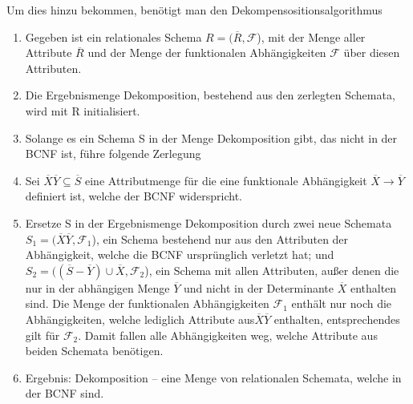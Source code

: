 Um dies hinzu bekommen, benötigt man den Dekompensositionsalgorithmus
\begin{enumerate}

\item Gegeben ist ein relationales Schema $R = (\overline R, \mathcal{F}$), mit der Menge aller Attribute $\overline R$ und der Menge der funktionalen Abhängigkeiten $\mathcal{F}$ über diesen Attributen.
\item	Die Ergebnismenge Dekomposition, bestehend aus den zerlegten Schemata, wird mit R initialisiert.
\item	Solange es ein Schema S in der Menge Dekomposition gibt, das nicht in der BCNF ist, führe folgende Zerlegung \item Sei $\overline X\overline Y\subseteq\overline S$ eine Attributmenge für die eine funktionale Abhängigkeit $\overline X\rightarrow \overline Y $definiert ist, welche der BCNF widerspricht.
\item Ersetze S in der Ergebnismenge Dekomposition durch zwei neue Schemata $S_1 = (\overline X\overline Y, \mathcal{F}_1$), ein Schema bestehend nur aus den Attributen der Abhängigkeit, welche die BCNF ursprünglich verletzt hat; und $S_2 = ((\overline S - \overline Y) \cup \overline X, \mathcal{F}_2$), ein Schema mit allen Attributen, außer denen die nur in der abhängigen Menge $\overline Y$ und nicht in der Determinante $\overline X$ enthalten sind. Die Menge der funktionalen Abhängigkeiten $\mathcal{F}_1$ enthält nur noch die Abhängigkeiten, welche lediglich Attribute aus$ \overline X\overline Y $ enthalten, entsprechendes gilt für $\mathcal{F}_2$. Damit fallen alle Abhängigkeiten weg, welche Attribute aus beiden Schemata benötigen.
\item Ergebnis: Dekomposition – eine Menge von relationalen Schemata, welche in der BCNF sind.
\end{enumerate}

